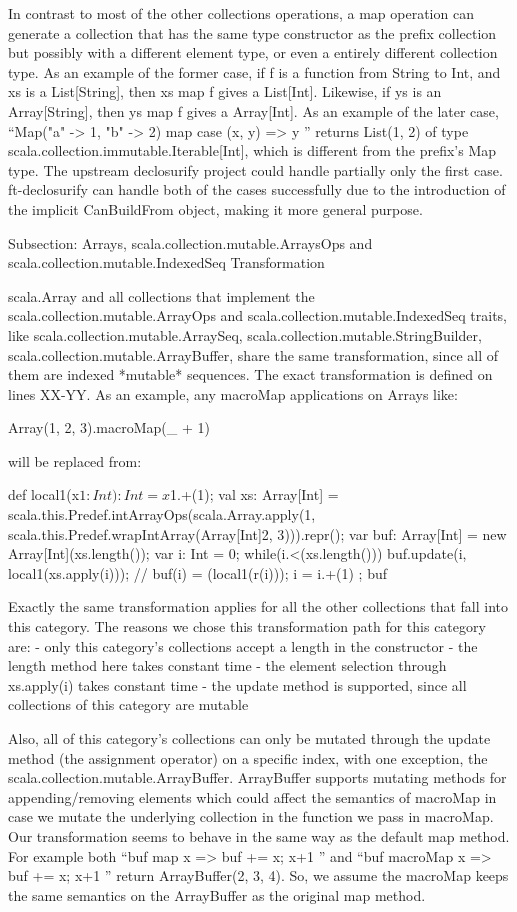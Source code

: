 In contrast to most of the other collections operations, a map operation can
generate a collection that has the same type constructor as the prefix
collection but possibly with a different element type, or even a entirely
different collection type. As an example of the former case, if f is a function
from String to Int, and xs is a List[String], then xs map f gives a List[Int].
Likewise, if ys is an Array[String], then ys map f gives a Array[Int]. As an
example of the later case,   ``Map("a" -> 1, "b" -> 2) map { case (x, y) => y
}'' returns List(1, 2) of type scala.collection.immutable.Iterable[Int],
which is different from the prefix's Map type. The upstream declosurify project
could handle partially only the first case. ft-declosurify can handle both of
the cases successfully due to the introduction of the implicit CanBuildFrom
object, making it more general purpose.


Subsection: Arrays, scala.collection.mutable.ArraysOps and
scala.collection.mutable.IndexedSeq Transformation

scala.Array and all collections that implement the 
scala.collection.mutable.ArrayOps and scala.collection.mutable.IndexedSeq
traits, like scala.collection.mutable.ArraySeq,
scala.collection.mutable.StringBuilder, scala.collection.mutable.ArrayBuffer,
share the same transformation, since all of them are indexed *mutable*
sequences. The exact transformation is defined on lines XX-YY. As an example,
any macroMap applications on Arrays like:

Array(1, 2, 3).macroMap(_ + 1)

will be replaced from:

{
  def local1(x$1: Int): Int = x$1.+(1);
  val xs: Array[Int] = scala.this.Predef.intArrayOps(scala.Array.apply(1,
scala.this.Predef.wrapIntArray(Array[Int]{2, 3}))).repr();
  var buf: Array[Int] = new Array[Int](xs.length());
  var i: Int = 0;
  while(i.<(xs.length())){
    buf.update(i, local1(xs.apply(i))); // buf(i) = (local1(r(i)));
    i = i.+(1)
  };
  buf
}

Exactly the same transformation applies for all the other collections that fall
into this category. The reasons we chose this transformation path for this
category are:
- only this category's collections accept a length in the constructor
- the length method here takes constant time
- the element selection through xs.apply(i) takes constant time
- the update method is supported, since all collections of this category are
mutable

Also, all of this category's collections can only be mutated through the
update method (the assignment operator) on a specific index, with one
exception, the scala.collection.mutable.ArrayBuffer. ArrayBuffer supports
mutating methods for appending/removing elements which could affect the
semantics of macroMap in case we mutate the underlying collection in the
function we pass in macroMap. Our transformation seems to behave in the same
way as the default map method. For example both ``buf map {
x => buf += x; x+1 }'' and ``buf macroMap { x => buf += x;
x+1 }'' return ArrayBuffer(2, 3, 4). So, we assume the macroMap keeps the
same semantics on the ArrayBuffer as the original map method.

